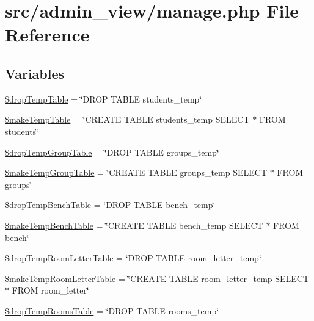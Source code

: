 \hypertarget{manage_8php}{\section{src/admin\-\_\-view/manage.php \-File \-Reference}
\label{manage_8php}
}
\subsection*{\-Variables}
\begin{DoxyCompactItemize}
\item 
\hyperlink{manage_8php_ab1dd9f6f45ee74e34c0430f067a3c215}{\$drop\-Temp\-Table} = \char`\"{}\-D\-R\-O\-P \-T\-A\-B\-L\-E students\-\_\-temp\char`\"{}
\item 
\hyperlink{manage_8php_a0febbda45804f1928bcedee869cd7317}{\$make\-Temp\-Table} = \char`\"{}\-C\-R\-E\-A\-T\-E \-T\-A\-B\-L\-E students\-\_\-temp \-S\-E\-L\-E\-C\-T $\ast$ \-F\-R\-O\-M students\char`\"{}
\item 
\hyperlink{manage_8php_a37871ad6099a27b6315fface9172c4d5}{\$drop\-Temp\-Group\-Table} = \char`\"{}\-D\-R\-O\-P \-T\-A\-B\-L\-E groups\-\_\-temp\char`\"{}
\item 
\hyperlink{manage_8php_ac943069bf7ec74f20a4d874e81a25d31}{\$make\-Temp\-Group\-Table} = \char`\"{}\-C\-R\-E\-A\-T\-E \-T\-A\-B\-L\-E groups\-\_\-temp \-S\-E\-L\-E\-C\-T $\ast$ \-F\-R\-O\-M groups\char`\"{}
\item 
\hyperlink{manage_8php_abf1c8fc767af82673be54ca48a20e0d8}{\$drop\-Temp\-Bench\-Table} = \char`\"{}\-D\-R\-O\-P \-T\-A\-B\-L\-E bench\-\_\-temp\char`\"{}
\item 
\hyperlink{manage_8php_ad31899f9608939d4b4d0166145cbf832}{\$make\-Temp\-Bench\-Table} = \char`\"{}\-C\-R\-E\-A\-T\-E \-T\-A\-B\-L\-E bench\-\_\-temp \-S\-E\-L\-E\-C\-T $\ast$ \-F\-R\-O\-M bench\char`\"{}
\item 
\hyperlink{manage_8php_a6d511c33a3f839e8b150f2df556d9cf0}{\$drop\-Temp\-Room\-Letter\-Table} = \char`\"{}\-D\-R\-O\-P \-T\-A\-B\-L\-E room\-\_\-letter\-\_\-temp\char`\"{}
\item 
\hyperlink{manage_8php_a5764a84ed61064638292cd39c4270cad}{\$make\-Temp\-Room\-Letter\-Table} = \char`\"{}\-C\-R\-E\-A\-T\-E \-T\-A\-B\-L\-E room\-\_\-letter\-\_\-temp \-S\-E\-L\-E\-C\-T $\ast$ \-F\-R\-O\-M room\-\_\-letter\char`\"{}
\item 
\hyperlink{manage_8php_ac3791b6f14bdbeeee37e52e7a7e8c98b}{\$drop\-Temp\-Rooms\-Table} = \char`\"{}\-D\-R\-O\-P \-T\-A\-B\-L\-E rooms\-\_\-temp\char`\"{}

\end{DoxyCompactItemize}
